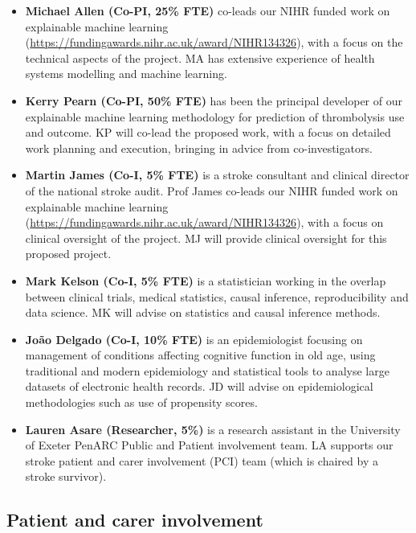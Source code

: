 \begin{itemize}

    \item \textbf{Michael Allen (Co-PI, 25\% FTE)} co-leads our NIHR funded work on explainable machine learning (\url{https://fundingawards.nihr.ac.uk/award/NIHR134326}), with a focus on the technical aspects of the project. MA has extensive experience of health systems modelling and machine learning.

    \item \textbf{Kerry Pearn (Co-PI, 50\% FTE)} has been the principal developer of our explainable machine learning methodology for prediction of thrombolysis use and outcome. KP will co-lead the proposed work, with a focus on detailed work planning and execution, bringing in advice from co-investigators.

    \item \textbf{Martin James (Co-I, 5\% FTE)} is a stroke consultant and clinical director of the national stroke audit. Prof James co-leads our NIHR funded work on explainable machine learning (\url{https://fundingawards.nihr.ac.uk/award/NIHR134326}), with a focus on clinical oversight of the project. MJ will provide clinical oversight for this proposed project.

    \item \textbf{Mark Kelson (Co-I, 5\% FTE)} is a statistician working in the overlap between clinical trials, medical statistics, causal inference, reproducibility and data science. MK will advise on statistics and causal inference methods.

    \item \textbf{João Delgado (Co-I, 10\% FTE)} is an epidemiologist focusing on management of conditions affecting cognitive function in old age, using traditional and modern epidemiology and statistical tools to analyse large datasets of electronic health records. JD will advise on epidemiological methodologies such as use of propensity scores.

    \item \textbf{Lauren Asare (Researcher, 5\%)} is a research assistant in the University of Exeter PenARC Public and Patient involvement team. LA supports our stroke patient and carer involvement (PCI) team (which is chaired by a stroke survivor).

\end{itemize}

\subsection{Patient and carer involvement}

